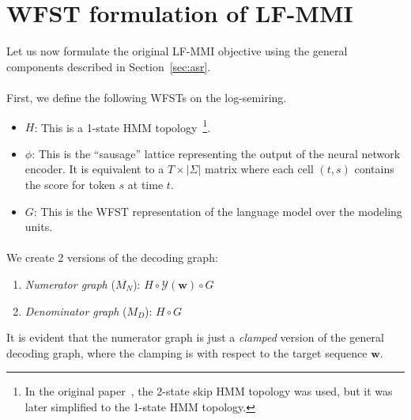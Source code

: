 \section{WFST formulation of LF-MMI}
\label{sec:lfmmi}

Let us now formulate the original LF-MMI objective using the general components described in Section~\ref{sec:asr}. 

\paragraph{} First, we define the following WFSTs on the log-semiring.

\begin{itemize}
\item $H$: This is a 1-state HMM topology~\footnote{In the original paper~\cite{Povey2016PurelySN}, the 2-state skip HMM topology was used, but it was later simplified to the 1-state HMM topology.}.
\item $\phi$: This is the ``sausage'' lattice representing the output of the neural network encoder. It is equivalent to a $T \times |\Sigma|$ matrix where each cell $(t,s)$ contains the score for token $s$ at time $t$.
\item $G$: This is the WFST representation of the language model over the modeling units.
\end{itemize}

\paragraph{} We create 2 versions of the decoding graph:

\begin{enumerate}
    \item \textit{Numerator graph} ($M_N$): $H \circ \mathcal{Y}(\mathbf{w}) \circ G$ 
    \item \textit{Denominator graph} ($M_D$): $H \circ G$
\end{enumerate}

It is evident that the numerator graph is just a \textit{clamped} version of the general decoding graph, where the clamping is with respect to the target sequence $\mathbf{w}$.


